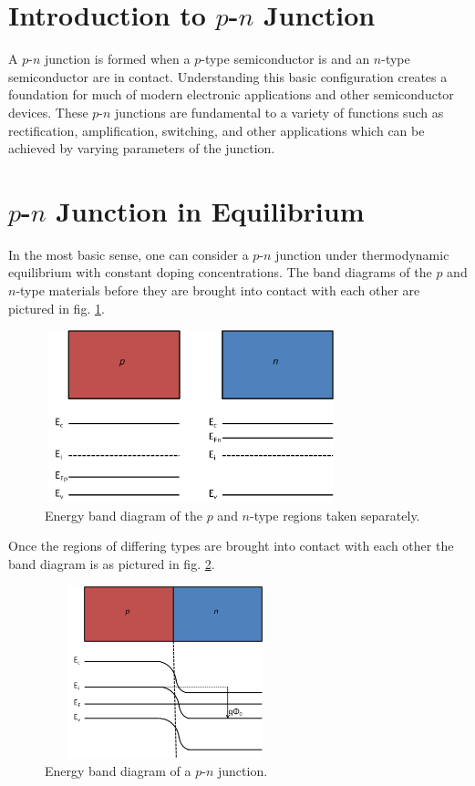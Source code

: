 \section{Introduction to $p$-$n$ Junction}\label{sec:sec001}
A $p$-$n$ junction is formed when a $p$-type semiconductor is and an $n$-type semiconductor are in contact.
Understanding this basic configuration creates a foundation for much of modern electronic
applications and other semiconductor devices. These $p$-$n$ junctions are fundamental to a variety of functions
such as rectification, amplification, switching, and other applications which can be achieved by varying parameters 
of the junction. 

\section{$p$-$n$ Junction in Equilibrium}\label{sec:sec002}
In the most basic sense, one can consider a $p$-$n$ junction under thermodynamic equilibrium with 
constant doping concentrations. The band diagrams of the $p$ and $n$-type materials before they are brought
into contact with each other are pictured in  fig. \ref{fig:fig01}. 

\begin{figure}[h!]\label{fig:fig01}
    \centering
    \includegraphics[height=5cm,width=8.5cm]{figs/unbiased_pn_junction_bands}
    \caption{Energy band diagram of the $p$ and $n$-type regions taken separately.}
\end{figure}

Once the regions of differing types are brought into contact with each other the band diagram is as
pictured in fig. \ref{fig:fig02}. 

\begin{figure}[h!]\label{fig:fig02}
    \centering
    \includegraphics[height=5cm,width=7cm]{figs/unbiased_pn_junction_bands_connected}
    \caption{Energy band diagram of a $p$-$n$ junction.}
\end{figure}

